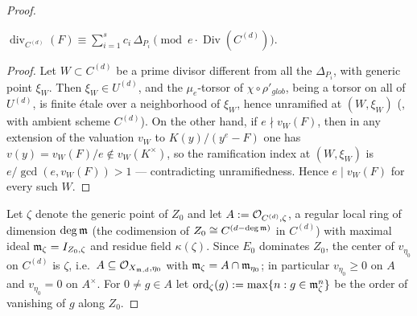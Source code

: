 \begin{proof}
    \begin{claim}\label{claim:divisor_congruence}
        $\operatorname{div}_{C^{(d)}}(F) \equiv \sum_{i=1}^{s} c_i \, \Delta_{P_i}
        \pmod{e \cdot \operatorname{Div}(C^{(d)})}$.
    \end{claim}
    \begin{proof}
        Let $W \subset C^{(d)}$ be a prime divisor different from all the $\Delta_{P_i}$, with generic
        point $\xi_W$. Then $\xi_W \in U^{(d)}$, and the $\mu_e$-torsor of $\chi \circ \rho'_{glob}$,
        being a torsor on all of $U^{(d)}$, is finite \'etale over a neighborhood of $\xi_W$, hence
        unramified at $(W, \xi_W)$ (, with ambient scheme
        $C^{(d)}$). On the other hand, if $e \nmid v_W(F)$, then in any extension of the valuation $v_W$
        to $K(y)/(y^e - F)$ one has $v(y) = v_W(F)/e \notin v_W(K^\times)$, so the ramification index at
        $(W, \xi_W)$ is $e / \gcd(e, v_W(F)) > 1$ --- contradicting unramifiedness. Hence
        $e \mid v_W(F)$ for every such $W$.
    \end{proof}

    Let $\zeta$ denote the generic point of $Z_0$ and let $A := \mathcal{O}_{C^{(d)}, \zeta}$, a regular local
    ring of dimension $\deg \mathfrak{m}$ (the codimension of $Z_0 \cong C^{(d - \deg\mathfrak{m})}$ in $C^{(d)}$)
    with maximal ideal $\mathfrak{m}_\zeta = I_{Z_0, \zeta}$ and residue field $\kappa(\zeta)$.
    Since $E_0$ dominates $Z_0$, the center of $v_{\eta_0}$ on $C^{(d)}$ is $\zeta$, i.e.\
    $A \subseteq \mathcal{O}_{X_{\mathfrak{m},d},\eta_0}$ with $\mathfrak{m}_\zeta = A \cap \mathfrak{m}_{\eta_0}$;
    in particular $v_{\eta_0} \geq 0$ on $A$ and $v_{\eta_0} = 0$ on $A^\times$.
    For $0 \neq g \in A$ let
    $\operatorname{ord}_\zeta(g) := \max\{ n : g \in \mathfrak{m}_\zeta^n \}$
    be the order of vanishing of $g$ along $Z_0$.


\end{proof}
